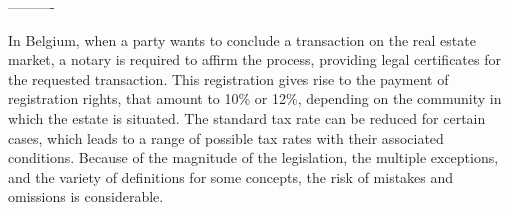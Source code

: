 
----------





In Belgium, when a party wants to conclude a transaction on the real estate market, a notary is required to affirm the process, providing legal certificates for the requested transaction.
This registration gives rise to the payment of registration rights, that amount to 10\% or 12\%, depending on the community in which the estate is situated.
The standard tax rate can be reduced for certain cases, which leads to a range of possible tax rates with their associated conditions. 
Because of the magnitude of the legislation, the multiple exceptions, and the variety of definitions for some concepts, the risk of mistakes and omissions is considerable.

